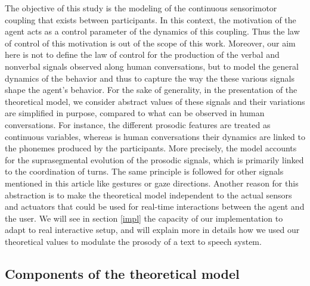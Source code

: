 The objective of this study is the modeling of the continuous sensorimotor coupling that exists between participants. In this context, the motivation of the agent acts as a control parameter of the dynamics of this coupling. Thus the law of control of this motivation is out of the scope of this work.
Moreover, our aim here is not to define the law of control for the production of the verbal and nonverbal signals observed along human conversations, but to model the general dynamics of the behavior and thus to capture the way the these various signals shape the agent's behavior. For the sake of generality, in the presentation of the theoretical model, we consider abstract values of these signals and their variations are simplified in purpose, compared to what can be observed in human conversations.
For instance, the different prosodic features are treated as continuous variables, whereas is human conversations their dynamics are linked to the phonemes produced by the participants. More precisely, the model accounts for the suprasegmental evolution of the prosodic signals, which is primarily linked to the coordination of turns.
The same principle is followed for other signals mentioned in this article like gestures or gaze directions. 
Another reason for this abstraction %
is to make the  theoretical model independent to the actual sensors and actuators that could be used for real-time interactions between the agent and the user. 
We will see in section \ref{impl} the capacity of our implementation to adapt to real interactive setup, and will explain more in details how we used our theoretical values to modulate the prosody of a text to speech system.

\subsection{Components of the theoretical model}

